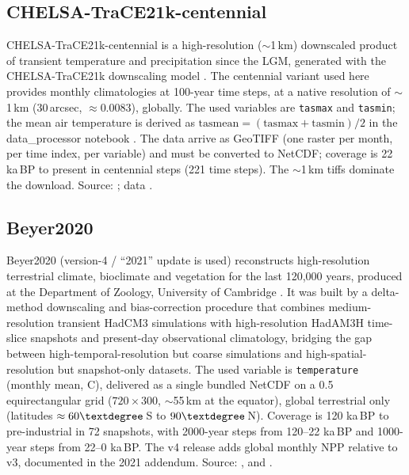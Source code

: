 \documentclass{isprs}
\newcommand{\dg}{\textdegree}
\newcommand{\degC}{\textdegree C}
\newcommand{\tabbr}[1]{\texttt{#1}}
\newcommand{\kaBP}{ka\,BP}
\begin{document}
\subsection{CHELSA-TraCE21k-centennial}
CHELSA-TraCE21k-centennial is a high-resolution ($\sim$1\,km) downscaled product of transient temperature and precipitation since the LGM, generated with the CHELSA-TraCE21k downscaling model \cite{chelsa_trace21k_paper,chelsa_trace21k_data}. The centennial variant used here provides monthly climatologies at 100-year time steps, at a native resolution of $\sim$1\,km (30\,arcsec, $\approx 0.0083$\dg), globally. The used variables are \tabbr{tasmax} and \tabbr{tasmin}; the mean air temperature is derived as $\mathrm{tasmean} = (\mathrm{tasmax}+\mathrm{tasmin})/2$ in the data\_processor notebook \cite{giersch2026_paleoclimate_model_comparison}. The data arrive as GeoTIFF (one raster per month, per time index, per variable) and must be converted to NetCDF; coverage is 22 \kaBP{} to present in centennial steps (221 time steps). The $\sim$1\,km tiffs dominate the download. Source: \cite{chelsa_trace21k_paper}; data \cite{chelsa_trace21k_data}.

\subsection{Beyer2020}
Beyer2020 (version-4 / ``2021'' update is used) reconstructs high-resolution terrestrial climate, bioclimate and vegetation for the last 120,000 years, produced at the Department of Zoology, University of Cambridge \cite{beyer2020_paper,beyer2021_addendum}. It was built by a delta-method downscaling and bias-correction procedure that combines medium-resolution transient HadCM3 simulations with high-resolution HadAM3H time-slice snapshots and present-day observational climatology, bridging the gap between high-temporal-resolution but coarse simulations and high-spatial-resolution but snapshot-only datasets. The used variable is \tabbr{temperature} (monthly mean, \degC), delivered as a single bundled NetCDF on a 0.5\dg{} equirectangular grid ($720\times300$, $\sim$55\,km at the equator), global terrestrial only (latitudes $\approx 60\dg$\,S to $90\dg$\,N). Coverage is 120 \kaBP{} to pre-industrial in 72 snapshots, with 2000-year steps from 120--22 \kaBP{} and 1000-year steps from 22--0 \kaBP. The v4 release adds global monthly NPP relative to v3, documented in the 2021 addendum. Source: \cite{beyer2020_paper}, \cite{beyer2021_addendum} and \cite{beyer2021_data_4}.
\end{document}

